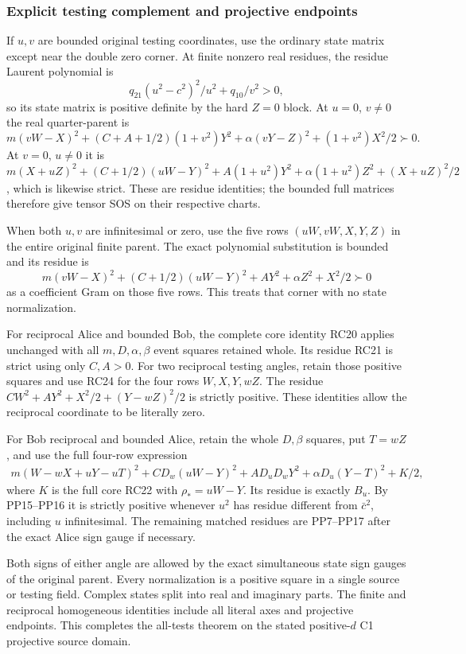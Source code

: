 \subsubsection*{Explicit testing complement and projective endpoints}

If $u,v$ are bounded original testing coordinates, use the ordinary
state matrix except near the double zero corner. At finite nonzero
real residues, the residue Laurent polynomial is
\[
 q_{21}(u^2-c^2)^2/u^2+q_{10}/v^2>0,
 \tag{PP18}
\]
so its state matrix is positive definite by the hard $Z=0$ block.
At $u=0$, $v\ne0$ the real quarter-parent is
\[
 m(vW-X)^2+(C+A+1/2)(1+v^2)Y^2
                       +\alpha(vY-Z)^2+(1+v^2)X^2/2\succ0.
\]
At $v=0$, $u\ne0$ it is
$m(X+uZ)^2+(C+1/2)(uW-Y)^2+A(1+u^2)Y^2
+\alpha(1+u^2)Z^2+(X+uZ)^2/2$, which is likewise strict.
These are residue identities; the bounded full matrices therefore
give tensor SOS on their respective charts.

When both $u,v$ are infinitesimal or zero, use the five rows
$(uW,vW,X,Y,Z)$ in the entire original finite parent. The exact
polynomial substitution is bounded and its residue is
\[
 m(vW-X)^2+(C+1/2)(uW-Y)^2+AY^2+\alpha Z^2+X^2/2\succ0
 \tag{PP19}
\]
as a coefficient Gram on those five rows. This treats that corner
with no state normalization.

For reciprocal Alice and bounded Bob, the complete core identity
RC20 applies unchanged with all $m,D,\alpha,\beta$ event squares
retained whole. Its residue RC21 is strict using only $C,A>0$.
For two reciprocal testing angles, retain those positive squares
and use RC24 for the four rows $W,X,Y,wZ$. The residue
$CW^2+AY^2+X^2/2+(Y-wZ)^2/2$ is strictly positive.
These identities allow the reciprocal coordinate to be literally zero.

For Bob reciprocal and bounded Alice, retain the whole $D,\beta$
squares, put $T=wZ$, and use the full four-row expression
\[
\begin{split}
 m(W-wX+uY-uT)^2+CD_w(uW-Y)^2
          +AD_uD_wY^2+\alpha D_u(Y-T)^2+K/2,
\end{split}
\]
where $K$ is the full core RC22 with $\rho_*=uW-Y$.
Its residue is exactly $B_u$. By PP15--PP16 it is strictly
positive whenever $u^2$ has residue different from $\bar c^2$,
including $u$ infinitesimal. The remaining matched residues are
PP7--PP17 after the exact Alice sign gauge if necessary.

Both signs of either angle are allowed by the exact simultaneous
state sign gauges of the original parent. Every normalization is
a positive square in a single source or testing field. Complex
states split into real and imaginary parts. The finite and
reciprocal homogeneous identities include all literal axes and
projective endpoints. This completes the all-tests theorem on the
stated positive-$d$ C1 projective source domain.



